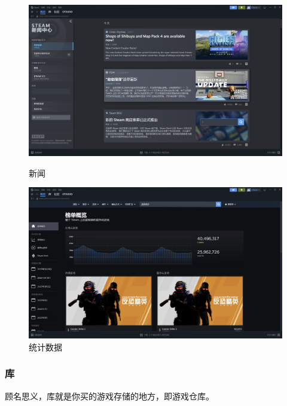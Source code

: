 \documentclass{article}
\begin{document}
        \begin{figure}[H]
            \centering
            \begin{minipage}{0.48\textwidth}
                \centering
                \includegraphics[width=\linewidth]{图/新闻中心.png}
                \caption{新闻}
                \label{fig:新闻中心}
            \end{minipage}
            \hfill
            \begin{minipage}{0.48\textwidth}
                \centering
                \includegraphics[width=\linewidth]{图/统计数据.png}
                \caption{统计数据}
                \label{fig:统计数据}
            \end{minipage}
        \end{figure}

        \subsubsection{库}
        顾名思义，库就是你买的游戏存储的地方，即游戏仓库。
\end{document}
